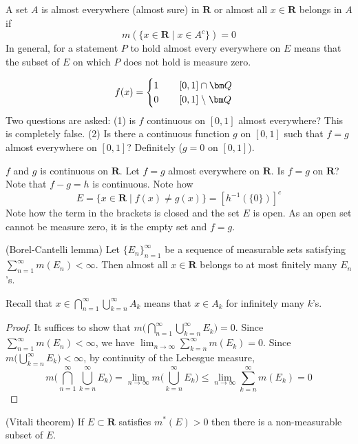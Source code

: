 \vspace{2ex}
\begin{defi}
A set $A$ is almost everywhere (almost sure) in ${\bm R}$ or almost all $x\in {\bm R}$ belongs in $A$ if 
\[m(\{x\in {\bm R} \;|\; x\in A^{c}\})=0\]
In general, for a statement $P$ to hold almost every everywhere on $E$ means that the subset of $E$ on which $P$ does not hold is measure zero. 
\end{defi}
\vspace{2ex}
\begin{ex}
\[f(x)=\begin{cases}
	1\hspace{5ex}[0,1]\cap {\bm Q}\\
	0\hspace{5ex}[0,1]\;\backslash\;{\bm Q}
\end{cases}\]
Two questions are asked: (1) is $f$ continuous on $[0,1]$ almost everywhere? This is completely false.
(2) Is there a continuous function $g$ on $[0,1]$ such that $f=g$ almost everywhere on $[0,1]$? Definitely ($g=0$ on $[0,1]$).
\end{ex}
\vspace{2ex}
\begin{ex}
$f$ and $g$ is continuous on ${\bm R}$. Let $f=g$ almost everywhere on ${\bm R}$. Is $f=g$ on ${\bm R}$? Note that $f-g=h$ is continuous. Note how
\[E=\{x\in {\bm R} \;|\; f(x)\ne g(x)\}=[h^{-1}(\{0\})]^{c}\]
Note how the term in the brackets is closed and the set $E$ is open. As an open set cannot be measure zero, it is the empty set and $f=g$. 
\end{ex}
\vspace{2ex}
\begin{lem}
(Borel-Cantelli lemma) Let $\{E_{n}\}_{n=1}^{\infty }$ be a sequence of measurable sets satisfying $\sum ^{\infty }_{n=1}m(E_{n})<\infty $. Then almost all $x\in {\bm R}$ belongs to at most finitely many $E_{n}$'s. 
\end{lem}
\vspace{2ex}
\begin{recall}
Recall that $x\in \bigcap ^{\infty }_{n=1}\bigcup ^{\infty }_{k=n}A_{k}$ means that $x\in A_{k}$ for infinitely many $k$'s. 
\end{recall}
\vspace{2ex}
\begin{proof}
It suffices to show that $m\Big(\bigcap _{n=1}^{\infty }\bigcup ^{\infty }_{k=n}E_{k}\Big)=0$. Since $\sum ^{\infty }_{n=1}m(E_{n})<\infty $, we have $\lim _{n\rightarrow \infty }\sum ^{\infty }_{k=n}m(E_{k})=0$. Since $m\Big(\bigcup ^{\infty }_{k=n}E_{k}\Big)<\infty $, by continuity of the Lebesgue measure,
\[m\Big(\bigcap ^{\infty }_{n=1}\bigcup ^{\infty }_{k=n}E_{k}\Big)=\lim _{n\rightarrow \infty }m\Big(\bigcup ^{\infty }_{k=n}E_{k}\Big)\leq \lim _{n\rightarrow \infty  }\sum _{k=n}^{\infty }m(E_{k})=0\]
\end{proof}
\vspace{2ex}
\begin{thm}
	(Vitali theorem) If $E\subset {\bm R}$ satisfies $m^{*}(E)>0$ then there is a non-measurable subset of $E$. 
\end{thm}
\vspace{2ex}
